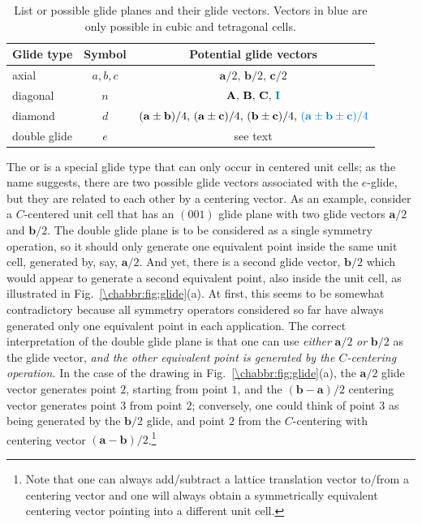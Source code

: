 \begin{table}[hb]
\centering\leavevmode
\begin{tabular}{|l|c|c|}
\hline
Glide type & Symbol & Potential glide vectors \\
\hline\hline
axial & $a, b, c$ & $\mathbf{a}/2,\,\mathbf{b}/2,\,\mathbf{c}/2$\\
diagonal & $n$ & $\mathbf{A},\,\mathbf{B},\,\mathbf{C},\,{\color{OCHighlandsSkyBlue}\mathbf{I}}$\\
diamond & $d$ & $(\mathbf{a}\pm\mathbf{b})/4,\,(\mathbf{a}\pm\mathbf{c})/4,\,(\mathbf{b}\pm\mathbf{c})/4,\,
{\color{OCHighlandsSkyBlue}(\mathbf{a}\pm\mathbf{b}\pm\mathbf{c})/4}$\\
double glide & $e$ & see text \\
\hline
\end{tabular}
\caption{\label{\chabbr:tb:glides}List or possible glide planes and their glide vectors.  Vectors in {\color{OCHighlandsSkyBlue}blue} are only possible in cubic and tetragonal cells.}
\end{table}


The  or  is a special glide type that can only occur in centered unit cells; as the name suggests, there are two possible glide vectors associated with the $e$-glide, but they are related to each other by a centering vector.   As an example, consider a $C$-centered unit cell that has an $(001)$  glide plane with two glide vectors $\mathbf{a}/2$ and $\mathbf{b}/2$.  The double glide plane is to be considered as a single symmetry operation, so it should only generate one equivalent point inside the same unit cell, generated by, say, $\mathbf{a}/2$. And yet, there is a second glide vector, $\mathbf{b}/2$ which would appear to generate a second equivalent point, also inside the unit cell, as illustrated in Fig.~\ref{\chabbr:fig:glide}(a).  At first, this seems to be somewhat contradictory because all symmetry operators considered so far have always generated only one equivalent point in each application. The correct interpretation of the double glide plane is that one can use \textit{either} $\mathbf{a}/2$ \textit{or} $\mathbf{b}/2$ as the glide vector, \textit{and the other equivalent point is generated by the $C$-centering operation.}  In the case of the drawing in Fig.~\ref{\chabbr:fig:glide}(a), the $\mathbf{a}/2$ glide vector generates point $2$, starting from point $1$, and the $(\mathbf{b}-\mathbf{a})/2$ centering vector generates point $3$ from point $2$; conversely, one could think of point $3$ as being generated by the $\mathbf{b}/2$ glide, and point $2$ from the $C$-centering with centering vector $(\mathbf{a}-\mathbf{b})/2$.\footnote{Note that one can always add/subtract a lattice translation vector to/from a centering vector and one will always obtain a symmetrically equivalent centering vector pointing into a different unit cell.}

